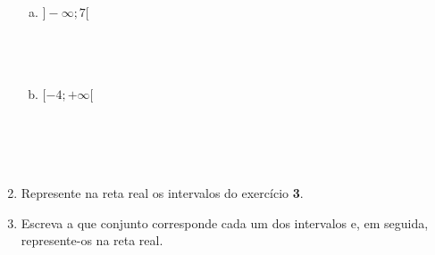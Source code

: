 \documentclass[a4paper,14pt]{article}
\begin{document}
\begin{multicols}{2}
\begin{enumerate}
\begin{enumerate}[a)]
		    	\item $]-\infty; 7[$ \\\\\\\\
		    	\item $[-4; +\infty[$ \\\\\\\\\\
		    \end{enumerate}	
	    	\item Represente na reta real os intervalos do exercício \textbf{3}.
	    			$~$ \\ $~$ \\ $~$ \\ $~$ \\ $~$ \\ $~$ \\ $~$ \\ $~$ \\ $~$ \\ $~$ \\ $~$ \\ $~$ \\ $~$ \\ $~$ \\ $~$ \\ $~$ \\ $~$ \\ $~$ \\ $~$ \\ $~$ \\ $~$ \\ $~$ \\ $~$ \\ $~$ \\ $~$ \\ $~$ \\ $~$ \\ $~$ \\ $~$ \\ $~$ \\ $~$ \\ $~$ \\ $~$ \\ $~$ \\ $~$ \\ $~$ \\ $~$ \\ $~$ \\ $~$ \\
	    	\item Escreva a que conjunto corresponde cada um dos intervalos e, em seguida, represente-os na reta real.

\end{enumerate}
\end{multicols}
\end{document}
